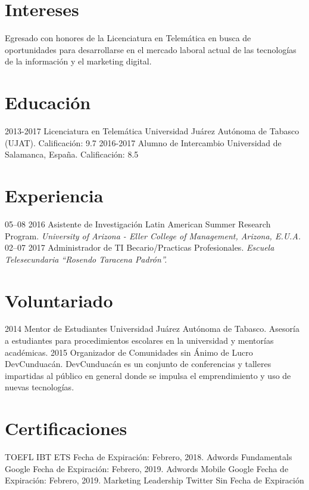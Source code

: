 \documentclass[]{friggeri-cv}
\begin{document}
\section{Intereses}
Egresado con honores de la Licenciatura en Telemática en busca de oportunidades para desarrollarse en el mercado laboral actual de las tecnologías de la información y el marketing digital.
\section{Educación}
\begin{entrylist}
  \entry
    {2013-2017}
    {Licenciatura en Telemática}
    {Universidad Juárez Autónoma de Tabasco (UJAT).}
    {Calificación: 9.7}
  \entry
    {2016-2017}
    {Alumno de Intercambio}
    {Universidad de Salamanca, España.}
    {Calificación: 8.5}
\end{entrylist}
\section{Experiencia}
\begin{entrylist}
  \entry
    {05–08 2016}
    {Asistente de Investigación}
    {Latin American Summer Research Program.}
    {\emph{University of Arizona - Eller College of Management, Arizona, E.U.A.}}
  \entry
    {02–07 2017}
    {Administrador de TI}
    {Becario/Practicas Profesionales.}
    {\emph{Escuela Telesecundaria “Rosendo Taracena Padrón”.}}
\end{entrylist}
\section{Voluntariado}
\begin{entrylist}
  \entry
    {2014}
    {Mentor de Estudiantes}
    {Universidad Juárez Autónoma de Tabasco.}
    {Asesoría a estudiantes para procedimientos escolares en la universidad y mentorías académicas.}
  \entry
    {2015}
    {Organizador de Comunidades sin Ánimo de Lucro}
    {DevCunduacán.}
    {DevCunduacán es un conjunto de conferencias y talleres impartidas al público en general donde se impulsa el emprendimiento y uso de nuevas tecnologías.}
\end{entrylist}
\section{Certificaciones}
\begin{entrylist}
          {TOEFL IBT}
          {ETS}
          {Fecha de Expiración: Febrero, 2018.}
          {Adwords Fundamentals}
          {Google}
          {Fecha de Expiración: Febrero, 2019.}
          {Adwords Mobile}
          {Google}
          {Fecha de Expiración: Febrero, 2019.}
          {Marketing Leadership}
          {Twitter}
          {Sin Fecha de Expiración}
\end{entrylist}
\newline
\newline
\newline
\newline
\newline
\end{document}
